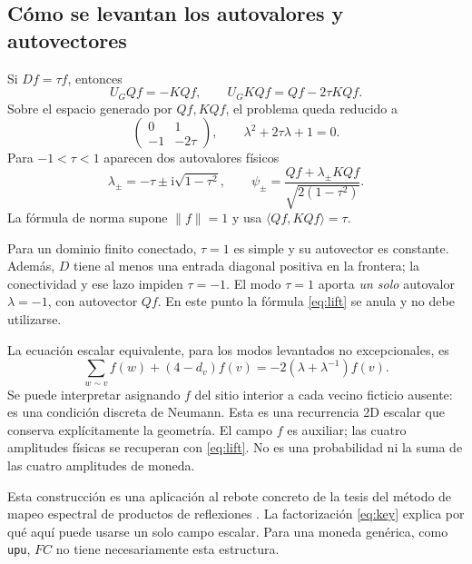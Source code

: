 \documentclass[11pt,a4paper]{article}
\newcommand{\ii}{\mathrm i}
\numberwithin{equation}{section}
\begin{document}
\subsection{Cómo se levantan los autovalores y autovectores}
Si $Df=\tau f$, entonces
\begin{equation}
 U_GQf=-KQf,\qquad U_GKQf=Qf-2\tau KQf.
\end{equation}
Sobre el espacio generado por $Qf,KQf$, el problema queda reducido a
\begin{equation}
 \begin{pmatrix}0&1\\-1&-2\tau\end{pmatrix},\qquad
 \boxed{\lambda^2+2\tau\lambda+1=0.}
\end{equation}
Para $-1<\tau<1$ aparecen dos autovalores físicos
\begin{equation}\label{eq:lift}
 \boxed{\lambda_\pm=-\tau\pm\ii\sqrt{1-\tau^2},\qquad
 \psi_\pm=\frac{Qf+\lambda_\pm KQf}{\sqrt{2(1-\tau^2)}}.}
\end{equation}
La fórmula de norma supone $\|f\|=1$ y usa
$\langle Qf,KQf\rangle=\tau$.

Para un dominio finito conectado, $\tau=1$ es simple y su autovector es constante. Además, $D$ tiene al menos una entrada diagonal positiva en la frontera; la conectividad y ese lazo impiden $\tau=-1$. El modo $\tau=1$ aporta \emph{un solo} autovalor $\lambda=-1$, con autovector $Qf$. En este punto la fórmula \eqref{eq:lift} se anula y no debe utilizarse.

La ecuación escalar equivalente, para los modos levantados no excepcionales, es
\begin{equation}\label{eq:scalar}
 \boxed{\sum_{w\sim v}f(w)+(4-d_v)f(v)
 =-2(\lambda+\lambda^{-1})f(v).}
\end{equation}
Se puede interpretar asignando $f$ del sitio interior a cada vecino ficticio ausente: es una condición discreta de Neumann. Esta es una recurrencia 2D escalar que conserva explícitamente la geometría. El campo $f$ es auxiliar; las cuatro amplitudes físicas se recuperan con \eqref{eq:lift}. No es una probabilidad ni la suma de las cuatro amplitudes de moneda.

Esta construcción es una aplicación al rebote concreto de la tesis del método de mapeo espectral de productos de reflexiones \cite{higuchi,konno}. La factorización \eqref{eq:key} explica por qué aquí puede usarse un solo campo escalar. Para una moneda genérica, como \texttt{upu}, $FC$ no tiene necesariamente esta estructura.
\end{document}
